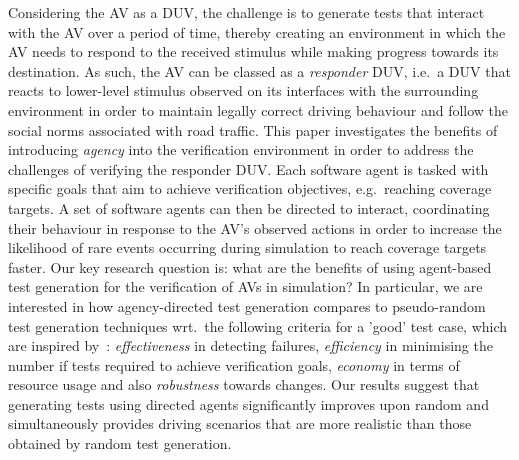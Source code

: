 \documentclass[runningheads,a4paper]{llncs}
\begin{document}
Considering the AV as a DUV, the challenge is to generate tests that interact with the AV over a period of time, thereby creating an environment in which the AV needs to respond to the received stimulus while making progress towards its destination. 
%
As such, the AV can be classed as a \textit{responder\/} DUV, i.e.\ a DUV that reacts to lower-level stimulus observed on its interfaces with the surrounding environment in order to maintain legally correct driving behaviour and follow the social norms associated with road traffic.
%
This paper investigates the benefits of introducing \textit{agency} into the verification environment in order to address the challenges of verifying the responder DUV. 
%
Each software agent is tasked with specific goals that aim to achieve verification objectives, e.g.\ reaching coverage targets.
%
A set of software agents can then be directed to interact, coordinating their behaviour in response to the AV's observed actions in order to increase the likelihood of rare events occurring during simulation to reach coverage targets faster.
%
Our key research question is: what are the benefits of using agent-based test generation for the verification of AVs in simulation?
%
In particular, we are interested in how agency-directed test generation compares to pseudo-random test generation techniques wrt.\ the following criteria for a 'good' test case, which are inspired by~\cite{fewster1999software}:
%
\textit{effectiveness} in detecting failures, 
\textit{efficiency} in minimising the number if tests required to achieve verification goals, 
\textit{economy} in terms of resource usage %
and also 
\textit{robustness} towards changes. 
%
Our results suggest that generating tests using directed agents significantly improves upon random and simultaneously provides driving scenarios that are more realistic than those obtained by random test generation.
\end{document}
